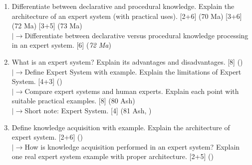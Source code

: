 \documentclass[12pt]{article}
\newcommand{\lb}{\\$\left|\rightarrow\right.$}
\begin{document}
\begin{enumerate}[topsep=0pt, noitemsep]
      \item Differentiate between declarative and procedural knowledge. Explain the architecture of an expert system (with practical uses). \hfill [2+6] (70 Ma) [3+6] (72 Ma) [3+5] (73 Ma)
        \lb Differentiate between declarative versus procedural knowledge processing in an expert system. \hfill [6] (\textit{72 Ma})

      \item What is an expert system? Explain its advantages and disadvantages. \hfill [8] ()
        \lb Define Expert System with example. Explain the limitations of Expert System. \hfill [4+3] ()
        \lb Compare expert systems and human experts. Explain each point with suitable practical examples. \hfill [8] (80 Ash)
        \lb Short note: Expert System. \hfill [4] (81 Ash, )

      \item Define knowledge acquisition with example. Explain the architecture of expert system. \hfill [2+6] ()
        \lb How is knowledge acquisition performed in an expert system? Explain one real expert system example with proper architecture. \hfill [2+5] ()
    \end{enumerate}
\end{document}
